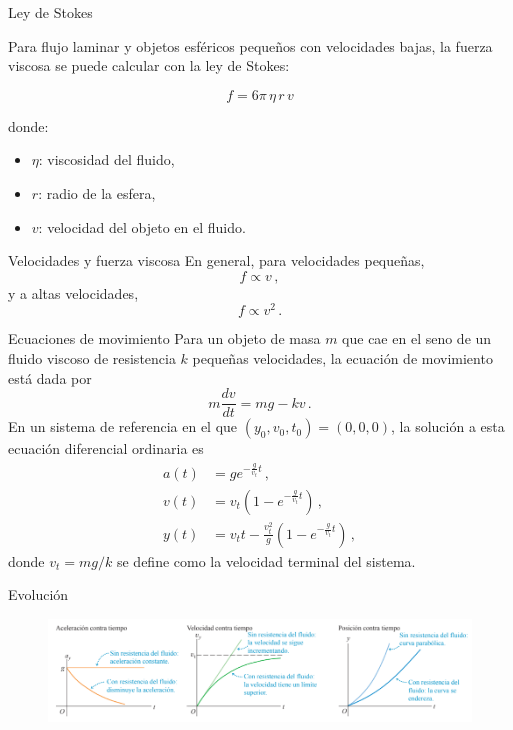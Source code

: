 \begin{frame}{Ley de Stokes}

Para flujo laminar y objetos esféricos pequeños con velocidades bajas, la fuerza viscosa se puede calcular con la ley de Stokes:

\[
f = 6 \pi \, \eta \, r \, v
\]

donde:
\begin{itemize}
    \item \(\eta\): viscosidad del fluido,
    \item \(r\): radio de la esfera,
    \item \(v\): velocidad del objeto en el fluido.
\end{itemize}

\end{frame}

\begin{frame}{Velocidades y fuerza viscosa}
    En general, para velocidades pequeñas, \begin{equation}
        f\propto v\,,
    \end{equation} y a altas velocidades, \begin{equation}
        f\propto v^2\,.
    \end{equation}
\end{frame}

\begin{frame}{Ecuaciones de movimiento}
    Para un objeto de masa $m$ que cae en el seno de un fluido viscoso de resistencia $k$ pequeñas velocidades, la ecuación de movimiento está dada por \begin{equation}
        m\frac{dv}{dt}=mg-kv\,.
    \end{equation} En un sistema de referencia en el que $(y_0,v_0,t_0)=(0,0,0)$, la solución a esta ecuación diferencial ordinaria es \begin{align}
        a(t)&=ge^{-\frac{g}{v_t}t}\,,\\
        v(t)&= v_t\left(1-e^{-\frac{g}{v_t}t}\right)\,,\\
        y(t)&=v_tt-\frac{v_t^2}{g}\left(1-e^{-\frac{g}{v_t}t}\right)\,,
    \end{align} donde $v_t=mg/k$ se define como la velocidad terminal del sistema.
\end{frame}

\begin{frame}{Evolución}
    \begin{figure}
        \centering
        \includegraphics[width=1\linewidth]{figures/vel-terminal.png}
    \end{figure}
\end{frame}

